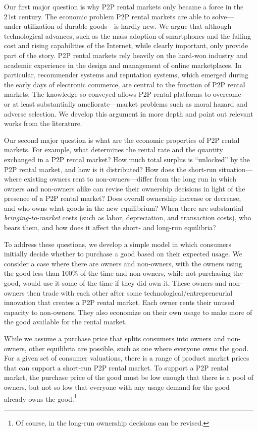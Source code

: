 \documentclass[11pt]{article}
\begin{document}
Our first major question is why P2P rental markets only became a force in the 21st century. 
The economic problem P2P rental markets are able to solve---under-utilization of durable goods---is hardly new.  
We argue that although technological advances, such as the mass adoption of smartphones and the falling cost and rising capabilities of the Internet, while clearly important, only provide part of the story. 
P2P rental markets rely heavily on the hard-won industry and academic experience in the design and management of online marketplaces.
In particular, recommender systems and reputation systems, which emerged during the early days of electronic commerce, are central to the function of P2P rental markets. 
The knowledge so conveyed allows P2P rental platforms to overcome---or at least substantially ameliorate---market problems such as moral hazard and adverse selection.  
We develop this argument in more depth and point out relevant works from the literature. 

Our second major question is what are the economic properties of P2P rental markets. 
For example, what determines the rental rate and the quantity exchanged in a P2P rental market? 
How much total surplus is ``unlocked'' by the P2P rental market, and how is it distributed? 
How does the short-run situation---where existing owners rent to non-owners---differ from the long run in which owners and non-owners alike can revise their ownership decisions in light of the presence of a P2P rental market?
Does overall ownership increase or decrease, and who owns what goods in the new equilibrium?
When there are substantial \emph{bringing-to-market} costs (such as labor, depreciation, and transaction costs), who bears them, and how does it affect the short- and long-run equilibria? 

To address these questions, we develop a simple model in which consumers initially decide whether to purchase a good based on their expected usage.
We consider a case where there are owners and non-owners, with the owners using the good less than 100\% of the time and non-owners, while not purchasing the good, would use it some of the time if they did own it. 
These owners and non-owners then trade with each other after some technological/entrepreneurial innovation that creates a P2P rental market.
Each owner rents their unused capacity to non-owners.
They also economize on their own usage to make more of the good available for the rental market.

While we assume a purchase price that splits consumers into owners and non-owners, other equilibria are possible, such as one where everyone owns the good.
For a given set of consumer valuations, there is a range of product market prices that can support a short-run P2P rental market.
To support a P2P rental market, the purchase price of the good must be low enough that there is a pool of owners, but not so low that everyone with any usage demand for the good already owns the good.\footnote{
  Of course, in the long-run ownership decisions can be revised.
}   
\end{document}
